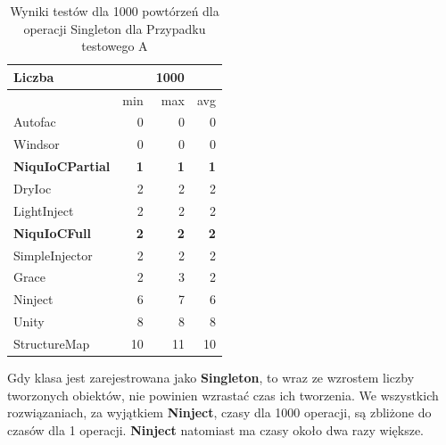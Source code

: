 \documentclass[12pt]{article}
\begin{document}
\begin{table}[H]
\captionsetup{belowskip=0pt,aboveskip=0pt}
\begin{center}
\begin{small}
	\begin{tabular}{ | l | r r r | }
    		\hline
Liczba & & 1000 & \\ \hline
 & min & max & avg \\ \hline
Autofac & 0 & 0 & 0 \\ \hline
Windsor & 0 & 0 & 0 \\ \hline
\textbf{NiquIoCPartial} & \textbf{1} & \textbf{1} & \textbf{1} \\ \hline
DryIoc & 2 & 2 & 2 \\ \hline
LightInject & 2 & 2 & 2 \\ \hline
\textbf{NiquIoCFull} & \textbf{2} & \textbf{2} & \textbf{2} \\ \hline
SimpleInjector & 2 & 2 & 2 \\ \hline
Grace & 2 & 3 & 2 \\ \hline
Ninject & 6 & 7 & 6 \\ \hline
Unity & 8 & 8 & 8 \\ \hline
StructureMap & 10 & 11 & 10 \\ \hline
  	\end{tabular}
\end{small}
\end{center}
\caption{Wyniki testów dla 1000 powtórzeń dla operacji Singleton dla Przypadku testowego A}
\label{TestCaseA_Singleton1000}
\end{table}
Gdy klasa jest zarejestrowana jako \textbf{Singleton}, to wraz ze wzrostem liczby tworzonych obiektów, nie powinien wzrastać czas ich tworzenia. We wszystkich rozwiązaniach, za wyjątkiem \textbf{Ninject}, czasy dla 1000 operacji, są zbliżone do czasów dla 1 operacji. \textbf{Ninject} natomiast ma czasy około dwa razy większe.
\end{document}
